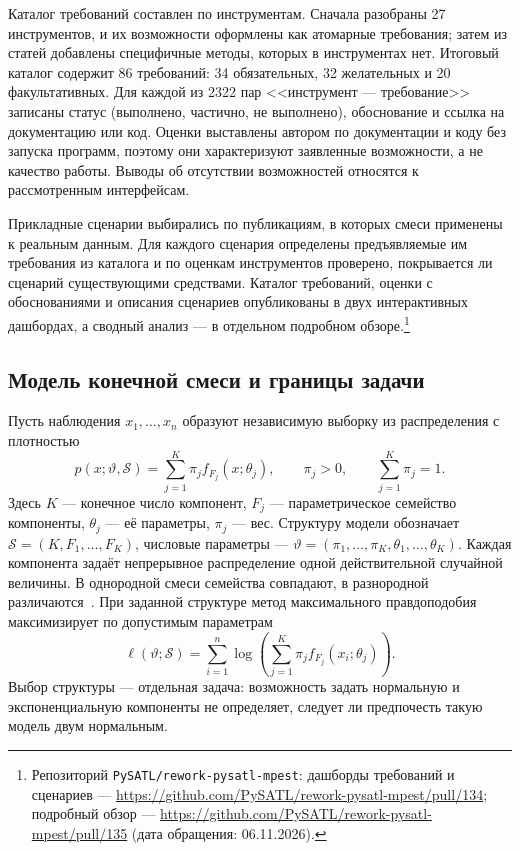 Каталог требований составлен по инструментам. Сначала разобраны 27 инструментов, и их возможности оформлены как атомарные требования; затем из статей добавлены специфичные методы, которых в инструментах нет. Итоговый каталог содержит 86 требований: 34 обязательных, 32 желательных и 20 факультативных. Для каждой из 2322 пар <<инструмент --- требование>> записаны статус (выполнено, частично, не выполнено), обоснование и ссылка на документацию или код. Оценки выставлены автором по документации и коду без запуска программ, поэтому они характеризуют заявленные возможности, а не качество работы. Выводы об отсутствии возможностей относятся к рассмотренным интерфейсам.

Прикладные сценарии выбирались по публикациям, в которых смеси применены к реальным данным. Для каждого сценария определены предъявляемые им требования из каталога и по оценкам инструментов проверено, покрывается ли сценарий существующими средствами. Каталог требований, оценки с обоснованиями и описания сценариев опубликованы в двух интерактивных дашбордах, а сводный анализ --- в отдельном подробном обзоре.\footnote{Репозиторий \texttt{PySATL/rework-pysatl-mpest}: дашборды требований и сценариев --- \url{https://github.com/PySATL/rework-pysatl-mpest/pull/134}; подробный обзор --- \url{https://github.com/PySATL/rework-pysatl-mpest/pull/135} (дата обращения: 06.11.2026).}

\subsection{Модель конечной смеси и границы задачи}
\label{sec:mixture-model}

Пусть наблюдения $x_1,\ldots,x_n$ образуют независимую выборку из распределения с плотностью
\begin{equation}
    p(x;\vartheta,\mathcal{S}) = \sum_{j=1}^{K}\pi_j f_{F_j}(x;\theta_j),
    \qquad \pi_j > 0,\qquad \sum_{j=1}^{K}\pi_j=1.
    \label{eq:mixture-density}
\end{equation}
Здесь $K$ --- конечное число компонент, $F_j$ --- параметрическое семейство компоненты, $\theta_j$ --- её параметры, $\pi_j$ --- вес. Структуру модели обозначает $\mathcal{S}=(K,F_1,\ldots,F_K)$, числовые параметры --- $\vartheta=(\pi_1,\ldots,\pi_K,\theta_1,\ldots,\theta_K)$. Каждая компонента задаёт непрерывное распределение одной действительной случайной величины. В однородной смеси семейства совпадают, в разнородной различаются~\cite{McLachlanPeel2000}. При заданной структуре метод максимального правдоподобия максимизирует по допустимым параметрам
\begin{equation}
    \ell(\vartheta;\mathcal{S})=
    \sum_{i=1}^{n}\log\left(\sum_{j=1}^{K}
    \pi_j f_{F_j}(x_i;\theta_j)\right).
    \label{eq:observed-likelihood}
\end{equation}
Выбор структуры --- отдельная задача: возможность задать нормальную и экспоненциальную компоненты не определяет, следует ли предпочесть такую модель двум нормальным.


